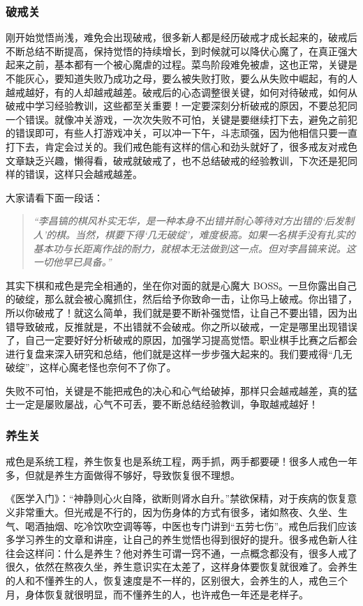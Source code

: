 \subsubsection{破戒关}

刚开始觉悟尚浅，难免会出现破戒，很多新人都是经历破戒才成长起来的，破戒后不断总结不断提高，保持觉悟的持续增长，到时候就可以降伏心魔了，在真正强大起来之前，基本都有一个被心魔虐的过程。菜鸟阶段难免被虐，这也正常，关键是不能灰心，要知道失败乃成功之母，要么被失败打败，要么从失败中崛起，有的人越戒越好，有的人却越戒越差。破戒后的心态调整很关键，如何对待破戒，如何从破戒中学习经验教训，这些都至关重要！一定要深刻分析破戒的原因，不要总犯同一个错误。就像冲关游戏，一次次失败不可怕，关键是要继续打下去，避免之前犯的错误即可，有些人打游戏冲关，可以冲一下午，斗志顽强，因为他相信只要一直打下去，肯定会过关的。我们戒色能有这样的信心和劲头就好了，很多戒友对戒色文章缺乏兴趣，懒得看，破戒就破戒了，也不总结破戒的经验教训，下次还是犯同样的错误，这样只会越戒越差。

大家请看下面一段话：

\begin{quote}\it
    “李昌镐的棋风朴实无华，是一种本身不出错并耐心等待对方出错的‘后发制人’的棋。当然，棋要下得‘几无破绽’，难度极高。如果一名棋手没有扎实的基本功与长距离作战的耐力，就根本无法做到这一点。但对李昌镐来说。这一切他早已具备。”
\end{quote}

其实下棋和戒色是完全相通的，坐在你对面的就是心魔大 BOSS。一旦你露出自己的破绽，那么就会被心魔抓住，然后给予你致命一击，让你马上破戒。你出错了，所以你破戒了！就这么简单，我们就是要不断补强觉悟，让自己不要出错，因为出错导致破戒，反推就是，不出错就不会破戒。你之所以破戒，一定是哪里出现错误了，自己一定要好好分析破戒的原因，加强学习提高觉悟。职业棋手比赛之后都会进行复盘来深入研究和总结，他们就是这样一步步强大起来的。我们要戒得“几无破绽”，这样心魔老怪也奈何不了你了。

失败不可怕，关键是不能把戒色的决心和心气给破掉，那样只会越戒越差，真的猛士一定是屡败屡战，心气不可丢，要不断总结经验教训，争取越戒越好！

\subsubsection{养生关}

戒色是系统工程，养生恢复也是系统工程，两手抓，两手都要硬！很多人戒色一年多，但就是养生方面做得不够好，导致恢复很不理想。

《医学入门》：“神静则心火自降，欲断则肾水自升。”禁欲保精，对于疾病的恢复意义非常重大。但光戒是不行的，因为伤身体的方式有很多，诸如熬夜、久坐、生气、喝酒抽烟、吃冷饮吹空调等等，中医也专门讲到“五劳七伤”。戒色后我们应该多学习养生的文章和讲座，让自己的养生觉悟也得到很好的提升。很多戒色新人往往会这样问：什么是养生？他对养生可谓一窍不通，一点概念都没有，很多人戒了很久，依然在熬夜久坐，养生意识实在太差了，这样身体要恢复就很难了。会养生的人和不懂养生的人，恢复速度是不一样的，区别很大，会养生的人，戒色三个月，身体恢复就很明显，而不懂养生的人，也许戒色一年还是老样子。

